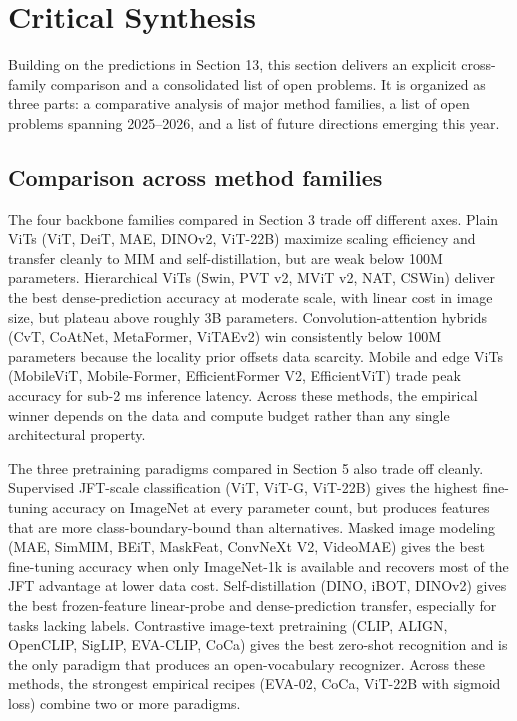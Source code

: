 \documentclass{article}
\begin{document}
\section{Critical Synthesis}\label{critical-synthesis}

Building on the predictions in Section 13, this section delivers an explicit cross-family comparison and a consolidated list of open problems. It is organized as three parts: a comparative analysis of major method families, a list of open problems spanning 2025--2026, and a list of future directions emerging this year.

\subsection{Comparison across method families}\label{comparison-across-method-families}

The four backbone families compared in Section 3 trade off different axes. Plain ViTs (ViT, DeiT, MAE, DINOv2, ViT-22B) maximize scaling efficiency and transfer cleanly to MIM and self-distillation, but are weak below 100M parameters. Hierarchical ViTs (Swin, PVT v2, MViT v2, NAT, CSWin) deliver the best dense-prediction accuracy at moderate scale, with linear cost in image size, but plateau above roughly 3B parameters. Convolution-attention hybrids (CvT, CoAtNet, MetaFormer, ViTAEv2) win consistently below 100M parameters because the locality prior offsets data scarcity. Mobile and edge ViTs (MobileViT, Mobile-Former, EfficientFormer V2, EfficientViT) trade peak accuracy for sub-2 ms inference latency. Across these methods, the empirical winner depends on the data and compute budget rather than any single architectural property.

The three pretraining paradigms compared in Section 5 also trade off cleanly. Supervised JFT-scale classification (ViT, ViT-G, ViT-22B) gives the highest fine-tuning accuracy on ImageNet at every parameter count, but produces features that are more class-boundary-bound than alternatives. Masked image modeling (MAE, SimMIM, BEiT, MaskFeat, ConvNeXt V2, VideoMAE) gives the best fine-tuning accuracy when only ImageNet-1k is available and recovers most of the JFT advantage at lower data cost. Self-distillation (DINO, iBOT, DINOv2) gives the best frozen-feature linear-probe and dense-prediction transfer, especially for tasks lacking labels. Contrastive image-text pretraining (CLIP, ALIGN, OpenCLIP, SigLIP, EVA-CLIP, CoCa) gives the best zero-shot recognition and is the only paradigm that produces an open-vocabulary recognizer. Across these methods, the strongest empirical recipes (EVA-02, CoCa, ViT-22B with sigmoid loss) combine two or more paradigms.
\end{document}
